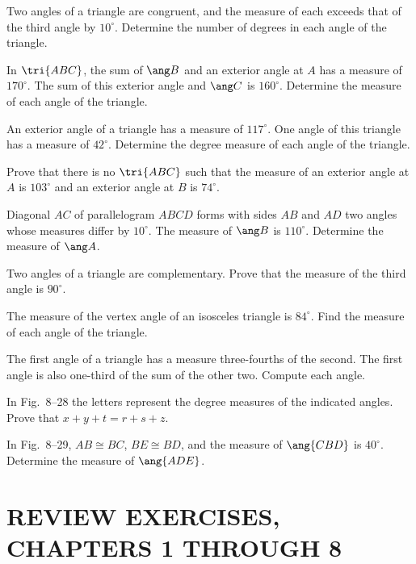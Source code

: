 \documentclass[11pt]{book}
\theoremstyle{bkplain}
\theoremstyle{XIplainnote}
\theoremstyle{bkplain}
\theoremstyle{bkplain}
\begin{document}
\begin{exlist}
\item Two angles of a triangle are congruent, and the measure of each exceeds
  that of the third angle by $10^\circ$. Determine the number of degrees in
  each angle of the triangle.
\item In $\tri{ABC}$, the sum of $\ang B$ and an exterior angle at $A$ has a
  measure of $170^\circ$. The sum of this exterior angle and $\ang C$ is
  $160^\circ$. Determine the measure of each angle of the triangle.
\item An exterior angle of a triangle has a measure of $117^\circ$. One angle
  of this triangle has a measure of $42^\circ$. Determine the degree measure
  of each angle of the triangle.
\item Prove that there is no $\tri{ABC}$ such that the measure of an exterior
  angle at $A$ is $103^\circ$ and an exterior angle at $B$ is $74^\circ$.
\item Diagonal $AC$ of parallelogram $ABCD$ forms with sides $AB$ and $AD$ two
  angles whose measures differ by $10^\circ$. The measure of $\ang B$ is
  $110^\circ$. Determine the measure of $\ang A$.
\item Two angles of a triangle are complementary. Prove that the measure of
  the third angle is $90^\circ$.
\item The measure of the vertex angle of an isosceles triangle is $84^\circ$.
  Find the measure of each angle of the triangle.
\item The first angle of a triangle has a measure three-fourths of the second.
  The first angle is also one-third of the sum of the other two. Compute each
  angle.
\item In Fig.~8--28 the letters represent the degree measures of the indicated
  angles. Prove that $x + y + t = r + s + z$.
\exfig{\FIGVIIITWENTYEIGHT}
\item In Fig.~8--29, $AB \cong BC$, $BE \cong BD$, and the measure of
  $\ang{CBD}$ is $40^\circ$. Determine the measure of $\ang{ADE}$.
\exfig{\FIGVIIITWENTYNINE}
\end{exlist}

\section*{REVIEW EXERCISES,\\CHAPTERS 1 THROUGH 8}
\end{document}
